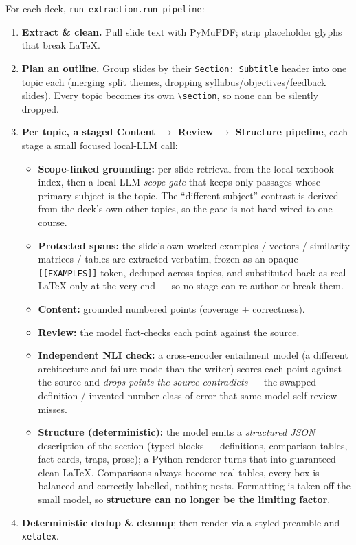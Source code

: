 \documentclass[11pt,a4paper]{article}
\begin{document}
For each deck, \texttt{run\_extraction.run\_pipeline}:

\begin{enumerate}[leftmargin=1.4em]
\item \textbf{Extract \& clean.} Pull slide text with PyMuPDF; strip placeholder glyphs that break \LaTeX.
\item \textbf{Plan an outline.} Group slides by their \texttt{Section: Subtitle} header into one topic each
  (merging split themes, dropping syllabus/objectives/feedback slides). Every topic becomes its own
  \texttt{\textbackslash section}, so none can be silently dropped.
\item \textbf{Per topic, a staged Content $\rightarrow$ Review $\rightarrow$ Structure pipeline}, each stage
  a small focused local-LLM call:
  \begin{itemize}
  \item \textbf{Scope-linked grounding:} per-slide retrieval from the local textbook index, then a local-LLM
    \emph{scope gate} that keeps only passages whose primary subject is the topic. The ``different subject''
    contrast is derived from the deck's own other topics, so the gate is not hard-wired to one course.
  \item \textbf{Protected spans:} the slide's own worked examples / vectors / similarity matrices / tables are
    extracted verbatim, frozen as an opaque \texttt{[[EXAMPLES]]} token, deduped across topics, and
    substituted back as real \LaTeX{} only at the very end --- so no stage can re-author or break them.
  \item \textbf{Content:} grounded numbered points (coverage + correctness).
  \item \textbf{Review:} the model fact-checks each point against the source.
  \item \textbf{Independent NLI check:} a cross-encoder entailment model (a different architecture and
    failure-mode than the writer) scores each point against the source and \emph{drops points the source
    contradicts} --- the swapped-definition / invented-number class of error that same-model self-review
    misses.
  \item \textbf{Structure (deterministic):} the model emits a \emph{structured JSON} description of the
    section (typed blocks --- definitions, comparison tables, fact cards, traps, prose); a Python renderer
    turns that into guaranteed-clean \LaTeX. Comparisons always become real tables, every box is balanced
    and correctly labelled, nothing nests. Formatting is taken off the small model, so \textbf{structure can
    no longer be the limiting factor}.
  \end{itemize}
\item \textbf{Deterministic dedup \& cleanup}; then render via a styled preamble and \texttt{xelatex}.
\end{enumerate}
\end{document}
